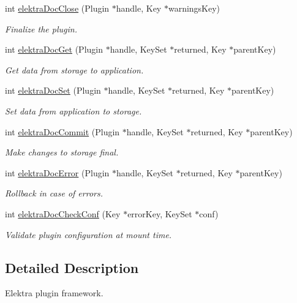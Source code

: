 \begin{DoxyCompactItemize}
int \hyperlink{group__plugin_ga1236aefe5b2baf8b7bf636ba5aa9ea29}{elektra\+Doc\+Close} (Plugin $\ast$handle, Key $\ast$warnings\+Key)
\begin{DoxyCompactList}\small\item\em Finalize the plugin. \end{DoxyCompactList}\item 
int \hyperlink{group__plugin_gacb69f3441c6d84241b4362f958fbe313}{elektra\+Doc\+Get} (Plugin $\ast$handle, Key\+Set $\ast$returned, Key $\ast$parent\+Key)
\begin{DoxyCompactList}\small\item\em Get data from storage to application. \end{DoxyCompactList}\item 
int \hyperlink{group__plugin_gae65781a1deb34efc79c8cb9d9174842c}{elektra\+Doc\+Set} (Plugin $\ast$handle, Key\+Set $\ast$returned, Key $\ast$parent\+Key)
\begin{DoxyCompactList}\small\item\em Set data from application to storage. \end{DoxyCompactList}\item 
int \hyperlink{group__plugin_ga52807469897b8acbada5bcc6b8c8ceab}{elektra\+Doc\+Commit} (Plugin $\ast$handle, Key\+Set $\ast$returned, Key $\ast$parent\+Key)
\begin{DoxyCompactList}\small\item\em Make changes to storage final. \end{DoxyCompactList}\item 
int \hyperlink{group__plugin_gad74b35f558ac7c3262f6069c5c47dc79}{elektra\+Doc\+Error} (Plugin $\ast$handle, Key\+Set $\ast$returned, Key $\ast$parent\+Key)
\begin{DoxyCompactList}\small\item\em Rollback in case of errors. \end{DoxyCompactList}\item 
int \hyperlink{group__plugin_ga1c8702efe0f3853c2d7ecca0889f78e8}{elektra\+Doc\+Check\+Conf} (Key $\ast$error\+Key, Key\+Set $\ast$conf)
\begin{DoxyCompactList}\small\item\em Validate plugin configuration at mount time. \end{DoxyCompactList}\end{DoxyCompactItemize}


\subsection{Detailed Description}
Elektra plugin framework. 


